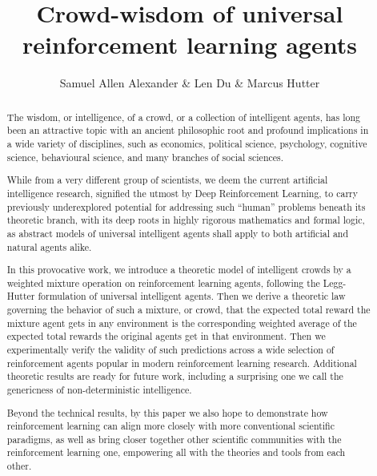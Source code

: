 \documentclass{article}
\begin{document}
\title{ Crowd-wisdom of universal reinforcement learning agents }
\author{Samuel Allen Alexander \& Len Du \& Marcus Hutter}


\maketitle

\begin{abstract}
The wisdom, or intelligence, of a crowd, or a collection of intelligent agents, has long been an attractive topic with an ancient philosophic root and profound implications in a wide variety of disciplines, such as economics, political science, psychology, cognitive science, behavioural science, and many branches of social sciences.

While from a very different group of scientists, we deem the current artificial intelligence research,
signified the utmost by Deep Reinforcement Learning,
to carry previously underexplored potential for addressing such ``human'' problems beneath its theoretic branch,
with its deep roots in highly rigorous mathematics and formal logic,
as abstract models of universal intelligent agents shall apply to both artificial and natural agents alike.

In this provocative work, we introduce a theoretic model of intelligent crowds by
 a weighted mixture operation on
reinforcement learning agents, following the Legg-Hutter formulation of universal intelligent agents.
Then we derive a theoretic law governing the behavior of such a mixture, or crowd, that  
the expected total reward the mixture agent
gets in any environment is the corresponding weighted average
of the expected total rewards the original agents get in that
environment. Then we experimentally verify the validity of such predictions across a wide selection of reinforcement agents popular in modern reinforcement learning research. Additional theoretic results are ready for future work,
including a surprising one
 we call the genericness of non-deterministic intelligence.

 Beyond the technical results, by this paper we also hope to demonstrate how reinforcement learning can align more closely with more conventional scientific paradigms, as well as bring closer together other scientific communities with the reinforcement learning one, empowering all with the theories and tools from each other.


\end{abstract}
\end{document}
